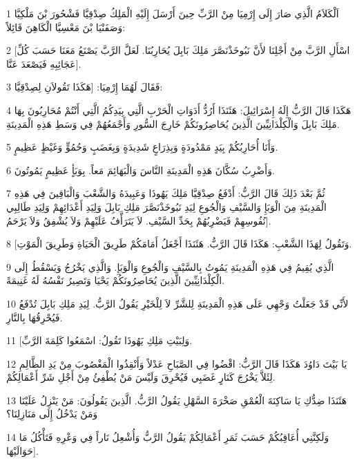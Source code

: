 \par 1 اَلْكَلاَمُ الَّذِي صَارَ إِلَى إِرْمِيَا مِنْ الرَّبِّ حِينَ أَرْسَلَ إِلَيْهِ الْمَلِكُ صِدْقِيَّا فَشْحُورَ بْنَ مَلْكِيَّا وَصَفَنْيَا بْنَ مَعْسِيَّا الْكَاهِنَ قَائِلاً:
\par 2 [اسْأَلِ الرَّبَّ مِنْ أَجْلِنَا لأَنَّ نَبُوخَذْنَصَّرَ مَلِكَ بَابِلَ يُحَارِبُنَا. لَعَلَّ الرَّبَّ يَصْنَعُ مَعَنَا حَسَبَ كُلِّ عَجَائِبِهِ فَيَصْعَدَ عَنَّا].
\par 3 فَقَالَ لَهُمَا إِرْمِيَا: [هَكَذَا تَقُولاَنِ لِصِدْقِيَّا:
\par 4 هَكَذَا قَالَ الرَّبُّ إِلَهُ إِسْرَائِيلَ: هَئَنَذَا أَرُدُّ أَدَوَاتِ الْحَرْبِ الَّتِي بِيَدِكُمُ الَّتِي أَنْتُمْ مُحَارِبُونَ بِهَا مَلِكَ بَابِلَ وَالْكِلْدَانِيِّينَ الَّذِينَ يُحَاصِرُونَكُمْ خَارِجَ السُّورِ وَأَجْمَعُهُمْ فِي وَسَطِ هَذِهِ الْمَدِينَةِ.
\par 5 وَأَنَا أُحَارِبُكُمْ بِيَدٍ مَمْدُودَةٍ وَبِذِرَاعٍ شَدِيدَةٍ وَبِغَضَبٍ وَحُمُوٍّ وَغَيْظٍ عَظِيمٍ.
\par 6 وَأَضْرِبُ سُكَّانَ هَذِهِ الْمَدِينَةِ النَّاسَ وَالْبَهَائِمَ مَعاً. بِوَبَأٍ عَظِيمٍ يَمُوتُونَ.
\par 7 ثُمَّ بَعْدَ ذَلِكَ قَالَ الرَّبُّ: أَدْفَعُ صِدْقِيَّا مَلِكَ يَهُوذَا وَعَبِيدَهُ وَالشَّعْبَ وَالْبَاقِينَ فِي هَذِهِ الْمَدِينَةِ مِنَ الْوَبَإِ وَالسَّيْفِ وَالْجُوعِ لِيَدِ نَبُوخَذْنَصَّرَ مَلِكِ بَابِلَ وَلِيَدِ أَعْدَائِهِمْ وَلِيَدِ طَالِبِي نُفُوسِهِمْ فَيَضْرِبُهُمْ بِحَدِّ السَّيْفِ. لاَ يَتَرَأَّفُ عَلَيْهِمْ وَلاَ يُشْفِقُ وَلاَ يَرْحَمُ].
\par 8 [وَتَقُولُ لِهَذَا الشَّعْبِ: هَكَذَا قَالَ الرَّبُّ. هَئَنَذَا أَجْعَلُ أَمَامَكُمْ طَرِيقَ الْحَيَاةِ وَطَرِيقَ الْمَوْتِ.
\par 9 الَّذِي يُقِيمُ فِي هَذِهِ الْمَدِينَةِ يَمُوتُ بِالسَّيْفِ وَالْجُوعِ وَالْوَبَإِ. وَالَّذِي يَخْرُجُ وَيَسْقُطُ إِلَى الْكِلْدَانِيِّينَ الَّذِينَ يُحَاصِرُونَكُمْ يَحْيَا وَتَصِيرُ نَفْسُهُ لَهُ غَنِيمَةً.
\par 10 لأَنِّي قَدْ جَعَلْتُ وَجْهِي عَلَى هَذِهِ الْمَدِينَةِ لِلشَّرِّ لاَ لِلْخَيْرِ يَقُولُ الرَّبُّ. لِيَدِ مَلِكِ بَابِلَ تُدْفَعُ فَيُحْرِقُهَا بِالنَّارِ.
\par 11 [وَلِبَيْتِ مَلِكِ يَهُوذَا تَقُولُ: اسْمَعُوا كَلِمَةَ الرَّبِّ.
\par 12 يَا بَيْتَ دَاوُدَ هَكَذَا قَالَ الرَّبُّ: اقْضُوا فِي الصَّبَاحِ عَدْلاً وَأَنْقِذُوا الْمَغْصُوبَ مِنْ يَدِ الظَّالِمِ لِئَلاَّ يَخْرُجَ كَنَارٍ غَضَبِي فَيُحْرِقَ وَلَيْسَ مَنْ يُطْفِئُ مِنْ أَجْلِ شَرِّ أَعْمَالِكُمْ.
\par 13 هَئَنَذَا ضِدُّكِ يَا سَاكِنَةَ الْعُمْقِ صَخْرَةَ السَّهْلِ يَقُولُ الرَّبُّ. الَّذِينَ يَقُولُونَ: مَنْ يَنْزِلُ عَلَيْنَا وَمَنْ يَدْخُلُ إِلَى مَنَازِلِنَا؟
\par 14 وَلَكِنَّنِي أُعَاقِبُكُمْ حَسَبَ ثَمَرِ أَعْمَالِكُمْ يَقُولُ الرَّبُّ وَأُشْعِلُ نَاراً فِي وَعْرِهِ فَتَأْكُلُ مَا حَوَالَيْهَا].

